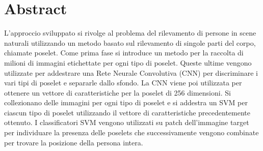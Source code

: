 \chapter*{Abstract} \label{abstract}
L'approccio sviluppato si rivolge al problema del rilevamento di persone in scene naturali utilizzando un metodo basato sul rilevamento di singole parti del corpo, chiamate poselet. Come prima fase si introduce un metodo per la raccolta di milioni di immagini etichettate per ogni tipo di poselet. Queste ultime vengono utilizzate per addestrare una Rete Neurale Convolutiva (CNN) per discriminare i vari tipi di poselet e separarle dallo sfondo. La CNN viene poi utilizzata per ottenere un vettore di caratteristiche per la poselet di 256 dimensioni. Si collezionano delle immagini per ogni tipo di poselet e si addestra un SVM per ciascun tipo di poselet utilizzando il vettore di caratteristiche precedentemente ottenuto. I classificatori SVM vengono utilizzati su patch dell'immagine target per individuare la presenza delle poselets che successivamente vengono combinate per trovare la posizione della persona intera.  